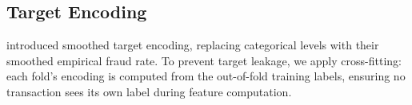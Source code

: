 \subsection{Target Encoding}

\citet{micci2001target} introduced smoothed target encoding, replacing
categorical levels with their smoothed empirical fraud rate.
To prevent target leakage, we apply cross-fitting: each fold's
encoding is computed from the out-of-fold training labels,
ensuring no transaction sees its own label during feature computation.
